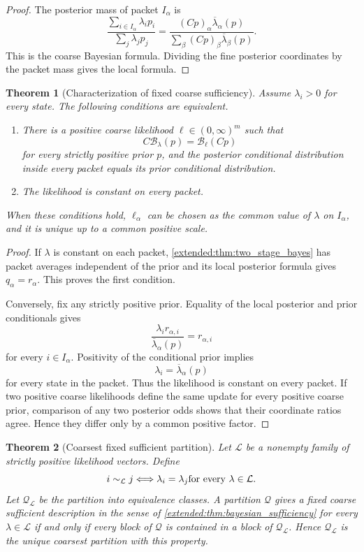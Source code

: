 \documentclass[11pt,letterpaper]{article}
\newtheorem{theorem}{Theorem}[section]
\theoremstyle{plain}
\theoremstyle{plain}
\theoremstyle{plain}
\theoremstyle{definition}
\theoremstyle{definition}
\theoremstyle{definition}
\theoremstyle{definition}
\theoremstyle{definition}
\theoremstyle{remark}
\theoremstyle{remark}
\theoremstyle{remark}
\theoremstyle{remark}
\theoremstyle{remark}
\theoremstyle{remark}
\newcommand{\Bcal}{\mathcal B}
\let\KomorebiPrimitiveMathcal\mathcal
\renewcommand{\mathcal}[1]{{\KomorebiPrimitiveMathcal{#1}}}
\begin{document}
\begin{proof}
The posterior mass of packet \(I_\alpha\) is
\[
\frac{\sum_{i\in I_\alpha}\lambda_ip_i}
{\sum_j\lambda_jp_j}
=
\frac{(Cp)_\alpha\overline\lambda_\alpha(p)}
{\sum_\beta(Cp)_\beta\overline\lambda_\beta(p)}.
\]
This is the coarse Bayesian formula. Dividing the fine posterior coordinates by the packet mass gives the local formula.
\end{proof}

\begin{theorem}[Characterization of fixed coarse sufficiency]\label{extended:record:050}\label{extended:thm:bayesian_sufficiency}
Assume \(\lambda_i>0\) for every state. The following conditions are equivalent.
\begin{enumerate}
\item There is a positive coarse likelihood \(\ell\in(0,\infty)^m\) such that
\[
C\Bcal_\lambda(p)
=
\Bcal_\ell(Cp)
\]
for every strictly positive prior \(p\), and the posterior conditional distribution inside every packet equals its prior conditional distribution.
\item The likelihood is constant on every packet.
\end{enumerate}
When these conditions hold, \(\ell_\alpha\) can be chosen as the common value of \(\lambda\) on \(I_\alpha\), and it is unique up to a common positive scale.
\end{theorem}

\begin{proof}
If \(\lambda\) is constant on each packet, \cref{extended:thm:two_stage_bayes} has packet averages independent of the prior and its local posterior formula gives \(q_\alpha=r_\alpha\). This proves the first condition.

Conversely, fix any strictly positive prior. Equality of the local posterior and prior conditionals gives
\[
\frac{\lambda_i r_{\alpha,i}}
{\overline\lambda_\alpha(p)}
=
r_{\alpha,i}
\]
for every \(i\in I_\alpha\). Positivity of the conditional prior implies
\[
\lambda_i=\overline\lambda_\alpha(p)
\]
for every state in the packet. Thus the likelihood is constant on every packet. If two positive coarse likelihoods define the same update for every positive coarse prior, comparison of any two posterior odds shows that their coordinate ratios agree. Hence they differ only by a common positive factor.
\end{proof}

\begin{theorem}[Coarsest fixed sufficient partition]\label{extended:record:051}\label{extended:thm:coarsest_bayesian_partition}
Let \(\mathcal L\) be a nonempty family of strictly positive likelihood vectors. Define
\[
i\sim_{\mathcal L}j
\quad\Longleftrightarrow\quad
\lambda_i=\lambda_j
\quad\hbox{for every }\lambda\in\mathcal L.
\]
Let \(\mathcal Q_{\mathcal L}\) be the partition into equivalence classes. A partition \(\mathcal Q\) gives a fixed coarse sufficient description in the sense of \cref{extended:thm:bayesian_sufficiency} for every \(\lambda\in\mathcal L\) if and only if every block of \(\mathcal Q\) is contained in a block of \(\mathcal Q_{\mathcal L}\). Hence \(\mathcal Q_{\mathcal L}\) is the unique coarsest partition with this property.
\end{theorem}
\end{document}
